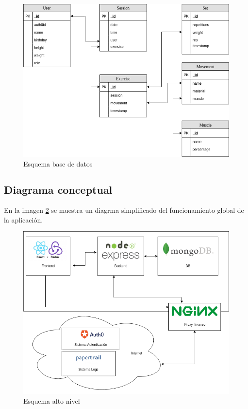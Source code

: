\begin{figure}
  \begin{center}
    \includegraphics[width=\textwidth]{imagenes/db.png}
    \caption{Esquema base de datos}
    \label{fig:db}
  \end{center}
\end{figure}

\subsection {Diagrama conceptual}
En la imagen \ref{fig:esquema_alto_nivel} se muestra un diagrma simplificado del funcionamiento global de la aplicación.
\begin{figure}
  \begin{center}
    \includegraphics[width=\textwidth]{imagenes/diagrama_conceptual.png}
    \caption{Esquema alto nivel}
    \label{fig:esquema_alto_nivel}
  \end{center}
\end{figure}


